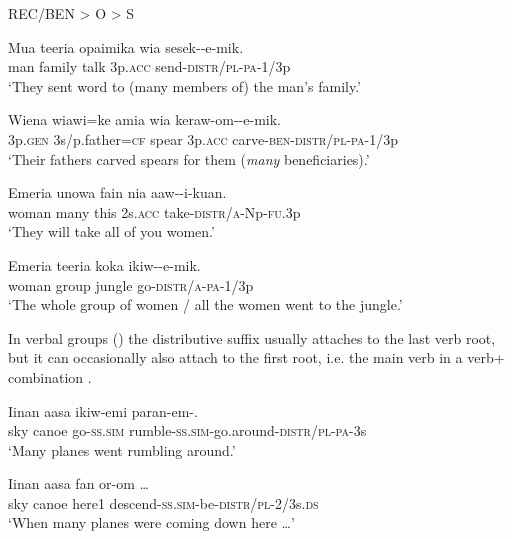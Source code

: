 \ea
\textsc{REC/BEN {{\textgreater}} O {{\textgreater}} S}
\z

\ea%
\label{ex:3:x209}
\gll Mua teeria opaimika wia sesek--e-mik. \\
man family talk 3p.\textsc{acc} send-\textsc{distr}/\textsc{pl}-\textsc{pa}-1/3p \\
\glt`They sent word to (many members of) the man's family.'
\z

\ea%
\label{ex:3:x429}
\gll Wiena wiawi=ke amia wia keraw-om--e-mik. \\
3p.\textsc{gen} 3s/p.father=\textsc{cf} spear 3p.\textsc{acc} carve-\textsc{ben}-\textsc{distr}/\textsc{pl}-\textsc{pa}-1/3p\\
\glt`Their fathers carved spears for them (\textit{many} beneficiaries).'
\z

\ea%
\label{ex:3:x492}
\gll Emeria unowa fain nia aaw--i-kuan. \\
woman many this 2s.\textsc{acc} take-\textsc{distr}/\textsc{a}-Np-\textsc{fu}.3p\\
\glt`They will take all of you women.'
\z

\ea%
\label{ex:3:x491}
\gll Emeria teeria koka ikiw--e-mik. \\
woman group jungle go-\textsc{distr}/\textsc{a}-\textsc{pa}-1/3p\\
\glt`The whole group of women / all the women went to the jungle.'
\z

In verbal groups () the distributive suffix usually attaches to the last verb root, but it can occasionally also attach to the first root, i.e. the main verb in a verb+ combination .

\ea%
\label{ex:3:x207}
\gll Iinan aasa ikiw-emi paran-em-. \\
sky canoe go-\textsc{ss}.\textsc{sim} rumble-\textsc{ss}.\textsc{sim}-go.around-\textsc{distr}/\textsc{pl}-\textsc{pa}-3s\\
\glt `Many planes went rumbling around.'
\z

\ea%
\label{ex:3:x490}
\gll Iinan aasa fan or-om {\dots} \\
sky canoe here1 descend-\textsc{ss}.\textsc{sim}-be-\textsc{distr}/\textsc{pl}-2/3s.\textsc{ds}\\
\glt`When many planes were coming down here {\dots}'
\z

